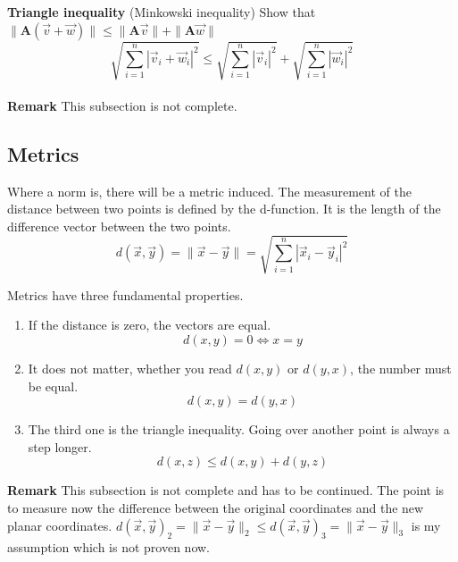 \documentclass[a4paper]{article}
\begin{document}
\textbf{Triangle inequality} (Minkowski inequality) Show that $ \|\boldsymbol{A}(\vec{v} + \vec{w})\| \leq \|\boldsymbol{A}\vec{v}\| + \|\boldsymbol{A}\vec{w}\|$\\

\begin{displaymath}
    \sqrt{\sum_{i=1}^{n}|\vec{v}_i + \vec{w}_i|^{2}} \leq \sqrt{\sum_{i=1}^{n}|\vec{v}_i|^{2}} + \sqrt{\sum_{i=1}^{n}|\vec{w}_i|^{2}} 
\end{displaymath}\\

\textbf{Remark} This subsection is not complete.

\subsection{Metrics}

Where a norm is, there will be a metric induced.
The measurement of the distance between two points is defined by the d-function. It is the length of the difference vector between the two points.\\
\begin{displaymath}
    d(\vec{x}, \vec{y}) = \|\vec{x}-\vec{y}\| = \sqrt{\sum_{i=1}^{n}|\vec{x}_i-\vec{y}_i|^2}
\end{displaymath}

Metrics have three fundamental properties.
\begin{enumerate}
\item If the distance is zero, the vectors are equal.
\begin{displaymath}
d(x,y) = 0 \iff x = y
\end{displaymath}
\item It does not matter, whether you read $d(x,y)$ or $d(y,x)$, the number must be equal.
\begin{displaymath}
d(x,y) = d(y,x)
\end{displaymath}
\item The third one is the triangle inequality. Going over another point is always a step longer.
\begin{displaymath}
d(x,z) \leq d(x,y) + d(y,z) 
\end{displaymath}
\end{enumerate}


\textbf{Remark} This subsection is not complete and has to be continued. The point is to measure now the difference between the original coordinates and the new planar coordinates. $d(\vec{x}, \vec{y})_2 = \|\vec{x}-\vec{y}\|_2 \leq d(\vec{x}, \vec{y})_3 = \|\vec{x}-\vec{y}\|_3$ is my assumption which is not proven now.
\end{document}

